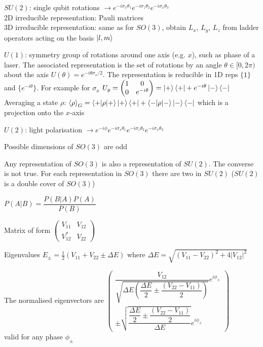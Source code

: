 \begin{squishlist}
    \item $SU(2)$: single qubit rotations $\rightarrow e^{-i \sigma_x \theta_1} e^{-i \sigma_z \theta_2} e^{-i \sigma_x \theta_3}$ \\
    2D irreducible representation: Pauli matrices \\
    3D irreducible representation: same as for $SO(3)$, obtain $L_x$, $L_y$, $L_z$ from ladder operators acting on the basis $\ket{l,m}$
    \item $U(1)$: symmetry group of rotations around one axis (e.g. $x$), such as phase of a laser. The associated representation is the set of rotations by an angle $\theta \in [0 , 2\pi)$ about the axis $U(\theta) = e^{-i\theta \sigma_x / 2}$. The representation is reducible in 1D reps $\{1\}$ and $\{ e^{-i\theta}\}$. For example for $\sigma_x$ $U_g = \begin{pmatrix} 1 & 0 \\ 0 & e^{-i \theta} \end{pmatrix} = \ket{+} \bra{+} + e^{-i\theta}\ket{-} \bra{-}$ \\
    Averaging a state $\rho$: $\braket{\rho}_G = \braket{+|\rho|+}\ket{+}\bra{+} + \braket{-|\rho|-}\ket{-}\bra{-}$ which is a projection onto the $x$-axis 

    \item $U(2)$: light polarisation $\rightarrow e^{-i\phi} e^{-i \sigma_x \theta_1} e^{-i \sigma_z \theta_2} e^{-i \sigma_x \theta_3}$
    
    \item Possible dimensions of $SO(3)$ are odd
    \item Any representation of $SO(3)$ is also a representation of $SU(2)$. The converse is not true. For each representation in $SO(3)$ there are two in $SU(2)$ ($SU(2)$ is a double cover of $SO(3)$)

\end{squishlist}

\columnbreak
{}
$P(A|B) = \dfrac{P(B|A)P(A)}{P(B)}$

\begin{squishlist}
\item Matrix of form $\begin{pmatrix} V_{11} & V_{12} \\ V_{12}^* & V_{22} \end{pmatrix}$
\item Eigenvalues $E_{\pm} = \frac{1}{2} (V_{11} + V_{22} \pm \Delta E)$ where $\Delta E = \sqrt{(V_{11} - V_{22})^2 + 4|V_{12}|^2}$
\item The normalised eigenvectors are $\begin{pmatrix}
    \dfrac{V_{12}}{\sqrt{\Delta E \left( \dfrac{\Delta E}{2} \pm \dfrac{(V_{22} - V_{11})}{2}\right)}} e^{i\phi_{\pm}} \\ 
    \pm \sqrt{\dfrac{\dfrac{\Delta E}{2} \pm \dfrac{(V_{22} - V_{11})}{2}}{\Delta E}} e^{i\phi_{\pm}}
\end{pmatrix}$ \\
valid for any phase $\phi_{\pm}$
\end{squishlist}

